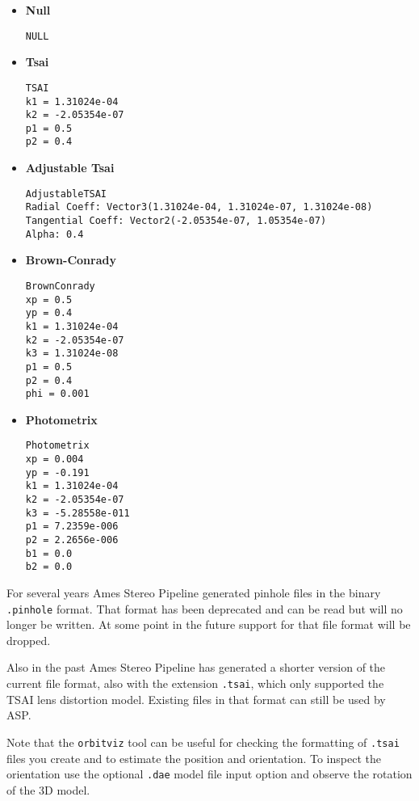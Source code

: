 \begin{itemize}{}
\item  \textbf{Null}
\begin{verbatim}
NULL
\end{verbatim}

\item  \textbf{Tsai}
\begin{verbatim}
TSAI
k1 = 1.31024e-04
k2 = -2.05354e-07
p1 = 0.5
p2 = 0.4
\end{verbatim}

\item  \textbf{Adjustable Tsai}
\begin{verbatim}
AdjustableTSAI
Radial Coeff: Vector3(1.31024e-04, 1.31024e-07, 1.31024e-08)
Tangential Coeff: Vector2(-2.05354e-07, 1.05354e-07)
Alpha: 0.4
\end{verbatim}

\item  \textbf{Brown-Conrady}
\begin{verbatim}
BrownConrady
xp = 0.5
yp = 0.4
k1 = 1.31024e-04
k2 = -2.05354e-07
k3 = 1.31024e-08
p1 = 0.5
p2 = 0.4
phi = 0.001
\end{verbatim}

\item  \textbf{Photometrix}
\begin{verbatim}
Photometrix
xp = 0.004
yp = -0.191
k1 = 1.31024e-04
k2 = -2.05354e-07
k3 = -5.28558e-011
p1 = 7.2359e-006
p2 = 2.2656e-006
b1 = 0.0
b2 = 0.0
\end{verbatim}

\end{itemize}{}

For several years Ames Stereo Pipeline generated pinhole files in the binary \texttt{.pinhole} format.
That format has been deprecated and can be read but will no longer be written.  
At some point in the future support for that file format will be dropped.

Also in the past Ames Stereo Pipeline has generated a shorter version of the current file
format, also with the extension \texttt{.tsai}, which only supported the TSAI lens distortion model.
Existing files in that format can still be used by ASP.

Note that the \texttt{orbitviz} tool can be useful for checking the formatting of \texttt{.tsai}
files you create and to estimate the position and orientation. To inspect the orientation use 
the optional \texttt{.dae} model file input option and observe the rotation of the 3D model.







